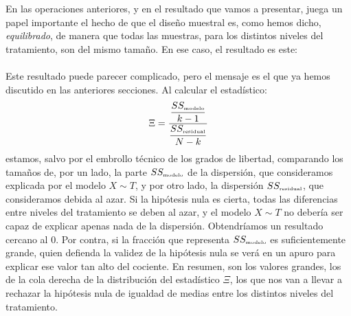 En las operaciones anteriores, y en el resultado que vamos a presentar, juega un papel importante el hecho de que el diseño muestral es, como hemos dicho, {\em equilibrado}, de manera que todas las muestras, para los distintos niveles del tratamiento, son del mismo tamaño. En ese caso, el resultado es este:\\[3mm]
    \\[3mm]
Este resultado puede parecer complicado, pero el mensaje es el que ya hemos discutido en las anteriores secciones. Al calcular el estadístico:
\[
\Xi=\dfrac{\dfrac{SS_{\mbox{\tiny modelo}}}{k-1}}{\dfrac{SS_{\mbox{\tiny residual}}}{N-k}}
\]
estamos, salvo por el embrollo técnico de los grados de libertad, comparando los tamaños de, por un lado,  la parte $SS_{\mbox{\tiny modelo}}$ de la dispersión, que consideramos explicada por el modelo $X \sim T$, y por otro lado, la dispersión $SS_{\mbox{\tiny residual}}$, que consideramos debida al azar. Si la hipótesis nula es
cierta, todas las diferencias entre niveles del tratamiento se deben al azar, y el modelo $X\sim T$
no debería ser capaz de explicar apenas nada de la dispersión. Obtendríamos un resultado cercano al
0. Por contra, si la fracción que representa $SS_{\mbox{\tiny modelo}}$ es suficientemente grande,
quien defienda la validez de la hipótesis nula se verá en un apuro para explicar ese valor tan alto
del cociente. En resumen, son los valores grandes, los de la cola derecha de la distribución del
estadístico $\Xi$, los que nos van a llevar a rechazar la hipótesis nula de igualdad de medias entre
los distintos niveles del tratamiento.

